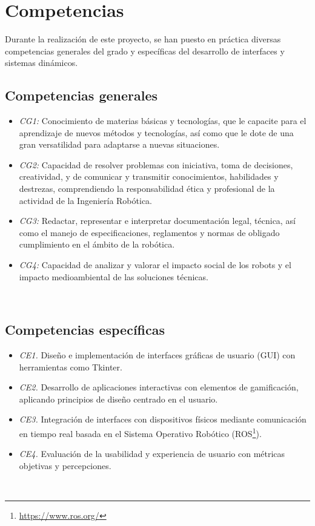 \section{Competencias}
\label{sec:competencias}

Durante la realización de este proyecto, se han puesto en práctica diversas competencias generales del grado y específicas del desarrollo de interfaces y sistemas dinámicos.

\subsection{Competencias generales}
\label{sec:competencias}

\begin{itemize}
    \item \textit{CG1:} Conocimiento de materias básicas y tecnologías, que le capacite para el aprendizaje de nuevos métodos y tecnologías, así como que le dote de una gran versatilidad para adaptarse a nuevas situaciones.
    \item \textit{CG2:} Capacidad de resolver problemas con iniciativa, toma de decisiones, creatividad, y de comunicar y transmitir conocimientos, habilidades y destrezas, comprendiendo la responsabilidad ética y profesional de la actividad de la Ingeniería Robótica.
    \item \textit{CG3:} Redactar, representar e interpretar documentación legal, técnica, así como el manejo de especificaciones, reglamentos y normas de obligado cumplimiento en el ámbito de la robótica.
    \item \textit{CG4:} Capacidad de analizar y valorar el impacto social de los robots y el impacto medioambiental de las soluciones técnicas.
\end{itemize}\

\subsection{Competencias específicas}
\label{sec:competencias}

\begin{itemize}
    \item \textit{CE1.} Diseño e implementación de interfaces gráficas de usuario (GUI) con herramientas como Tkinter.
    \item \textit{CE2.} Desarrollo de aplicaciones interactivas con elementos de gamificación, aplicando principios de diseño centrado en el usuario.
    \item \textit{CE3.} Integración de interfaces con dispositivos físicos mediante comunicación en tiempo real basada en el Sistema Operativo Robótico (ROS\footnote{\url{https://www.ros.org/}}).
    \item \textit{CE4.} Evaluación de la usabilidad y experiencia de usuario con métricas objetivas y percepciones.
\end{itemize}\

